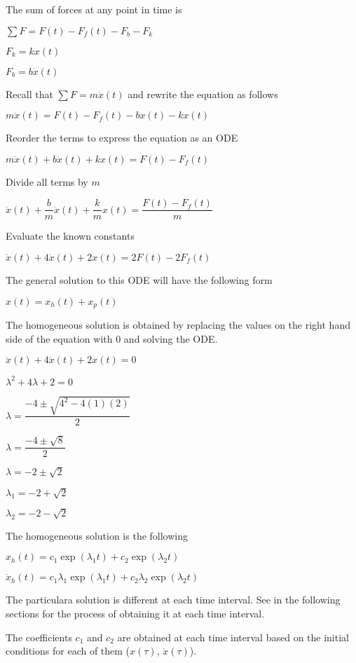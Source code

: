 The sum of forces at any point in time is 

$\sum F = F(t) - F_f (t) - F_b - F_k$ 

$F_k = k x(t)$

$F_b = b \dot{x}(t)$

Recall that $\sum F = m \ddot{x}(t)$ and rewrite the equation as follows

$ m \ddot{x}(t) = F(t) - F_f (t) - b \ddot{x}(t) - k x(t)$

Reorder the terms to express the equation as an ODE

$ m \ddot{x}(t) + b \ddot{x}(t) + k x(t) = F(t) - F_f (t)$

Divide all terms by $m$

$  \ddot{x}(t) + \dfrac{b}{m} \ddot{x}(t) + \dfrac{k}{m} x(t) = \dfrac{F(t) - F_f (t)}{m}$

Evaluate the known constants

$  \ddot{x}(t) + 4 \ddot{x}(t) + 2 x(t) = 2 F(t) - 2 F_f (t)$


The general solution to this ODE will have the following form

$x(t) = x_h (t) + x_p (t)$

The homogeneous solution is obtained by replacing the values on the right hand side of the equation with 0 and solving the ODE.

$\ddot{x}(t) + 4 \ddot{x}(t) + 2 x(t) = 0$

$\lambda^2 + 4 \lambda +2 = 0$

$\lambda = \dfrac{-4\pm \sqrt{4^2 - 4 (1) (2)}}{2}$

$\lambda = \dfrac{-4\pm \sqrt{8}}{2}$

$\lambda = -2\pm \sqrt{2}$

$\lambda_1 = -2 + \sqrt{2}$

$\lambda_2 = -2 - \sqrt{2}$

The homogeneous solution is the following

$x_h (t) = c_1 \exp{(\lambda_1 t)} + c_2 \exp{(\lambda_2 t)}$

$\dot{x}_h (t) = c_1 \lambda_1 \exp{(\lambda_1 t)} + c_2 \lambda_2 \exp{(\lambda_2 t)}$

The particulara solution is different at each time interval. See in the following sections for the process of obtaining it at each time interval.

The coefficients $c_1$ and $c_2$ are obtained at each time interval based on the initial conditions for each of them ($x(\tau)$, $\dot{x}(\tau)$).

